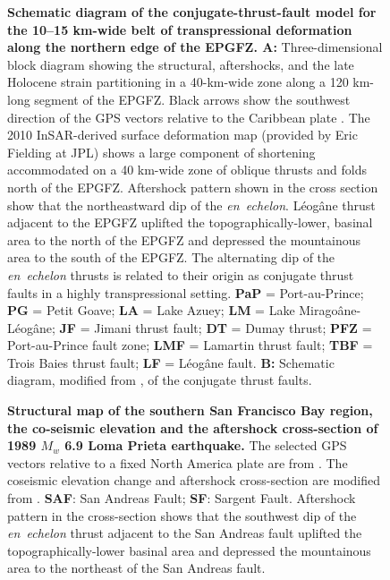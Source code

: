 \documentclass[linenumbers,draft]{agujournal}
\begin{document}
\begin{figure}
\centering
\caption{\textbf{Schematic diagram of the conjugate-thrust-fault model for the 10--15 km-wide belt of transpressional deformation along the northern edge of the EPGFZ. A:} Three-dimensional block diagram showing the structural, aftershocks, and the late Holocene strain partitioning in a 40-km-wide zone along a 120 km-long segment of the EPGFZ. Black arrows show the southwest direction of the GPS vectors relative to the Caribbean plate \citep{calais2010transpressional}. The 2010 InSAR-derived surface deformation map (provided by Eric Fielding at JPL) \citep{hayes2010complex} shows a large component of shortening accommodated on a 40 km-wide zone of oblique thrusts and folds north of the EPGFZ. Aftershock pattern shown in the cross section show that the northeastward dip of the \textit{en~echelon}. L\'eog\^ane thrust adjacent to the EPGFZ uplifted the topographically-lower, basinal area to the north of the EPGFZ and depressed the mountainous area to the south of the EPGFZ. The alternating dip of the \textit{en~echelon} thrusts is related to their origin as conjugate thrust faults in a highly transpressional setting. \textbf{PaP} = Port-au-Prince; \textbf{PG} = Petit Goave; \textbf{LA} = Lake Azuey; \textbf{LM} = Lake Mirago\^ane-L\'eog\^ane; \textbf{JF} = Jimani thrust fault; \textbf{DT} = Dumay thrust; \textbf{PFZ} = Port-au-Prince fault zone; \textbf{LMF} = Lamartin thrust fault; \textbf{TBF} = Trois Baies thrust fault; \textbf{LF} = L\'eog\^ane fault. \textbf{B:} Schematic diagram, modified from \citet{sibson2012reverse}, of the conjugate thrust faults.}
\label{figure10}
\end{figure}

\begin{figure}
\centering
\caption{\textbf{Structural map of the southern San Francisco Bay region, the co-seismic elevation and the aftershock cross-section of 1989 $M_w$ 6.9  Loma Prieta earthquake.} The selected GPS vectors relative to a fixed North America plate are from \citet{UNAVCO2009}. The coseismic elevation change and aftershock cross-section are modified from \citet{marshall1991faulting}. \textbf{SAF}: San Andreas Fault; \textbf{SF}: Sargent Fault. Aftershock pattern in the cross-section shows that the southwest dip of the \textit{en~echelon} thrust adjacent to the San Andreas fault uplifted the topographically-lower basinal area and depressed the mountainous area to the northeast of the San Andreas fault.}
\label{figure11}
\end{figure}
\end{document}
